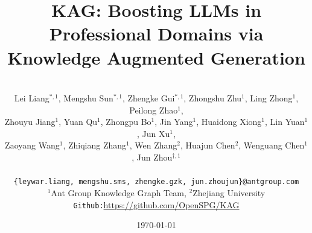\documentclass{article}
\begin{document}

\title{KAG: Boosting LLMs in Professional Domains via Knowledge Augmented Generation} 

\author{\\Lei Liang$^{\ast,1}$, Mengshu Sun$^{\ast,1}$, Zhengke Gui$^{\ast,1}$, Zhongshu Zhu$^{1}$, Ling Zhong$^{1}$, Peilong Zhao$^{1}$, \\ 
Zhouyu Jiang$^{1}$, Yuan Qu$^{1}$, Zhongpu Bo$^{1}$, Jin Yang$^{1}$, 
Huaidong Xiong$^{1}$, Lin Yuan$^{1}$, Jun Xu$^{1}$, \\
Zaoyang Wang$^{1}$, Zhiqiang Zhang$^{1}$, Wen Zhang$^{2}$, Huajun Chen$^{2}$, Wenguang Chen$^{1}$, Jun Zhou$^{\dagger,1}$ \\
\\
\texttt{\{leywar.liang, mengshu.sms, zhengke.gzk, jun.zhoujun\}@antgroup.com} \\
\AND
$^{1}$Ant Group Knowledge Graph Team, $^{2}$Zhejiang University
\AND
{\texttt{Github:}\href{https://github.com/OpenSPG/KAG}{https://github.com/OpenSPG/KAG}}
}



\date{\today}

\setlength{\parindent}{0pt}

\maketitle
\end{document}
